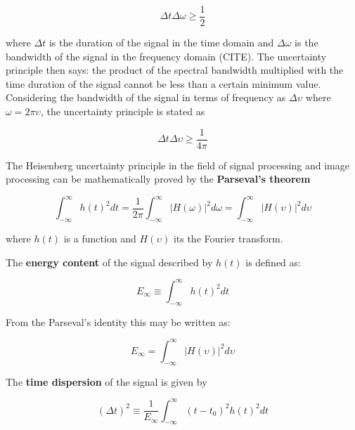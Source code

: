 \begin{equation}\label{eq:uncertainty_principle_rad}
	\Delta t\Delta \omega \geq \frac{1}{2}
\end{equation}

where $\Delta t$ is the duration of the signal in the time domain and $\Delta \omega$ is the bandwidth of the signal in the frequency domain (CITE). The uncertainty principle then says: the product of the spectral bandwidth multiplied with the time duration of the signal cannot be less than a certain minimum value. Considering the bandwidth of the signal in terms of frequency as $\Delta \upsilon$ where $\omega = 2\pi \upsilon$, the uncertainty principle is stated as 

\begin{equation}\label{eq:uncertainty_principle_freq}
	\Delta t\Delta \upsilon \geq \frac{1}{4\pi}
\end{equation}

The Heisenberg uncertainty principle in the field of signal processing and image processing can be mathematically proved by the \textbf{Parseval's theorem}

\begin{equation}\label{eq:parseval_theorem}
	\int_{-\infty}^{\infty} h(t)^2 dt =  \frac{1}{2 \pi} \int_{-\infty}^{\infty} |H(\omega)|^2 d\omega =  \int_{-\infty}^{\infty} |H(\upsilon)|^2 d\upsilon
\end{equation}

where $h(t)$ is a function and $H(\upsilon)$ its the Fourier transform. 

The \textbf{energy content} of the signal described by $h(t)$ is defined as:

\begin{equation}\label{eq:energy_content_time}
    E_{\infty} \equiv \int_{-\infty}^{\infty}  h(t)^2 dt
\end{equation}


From the Parseval's identity this may be written as:

\begin{equation}\label{eq:energy_content_frequency}
    E_{\infty} =  \int_{-\infty}^{\infty} |H(\upsilon)|^2 d\upsilon
\end{equation}

The \textbf{time dispersion} of the signal is given by

\begin{equation}\label{eq:time_dispersion_no_centered}
    (\Delta t)^2 \equiv \frac{1}{E_{\infty}} \int_{-\infty}^{\infty} (t-t_{0})^2 h(t)^2 dt
\end{equation}

